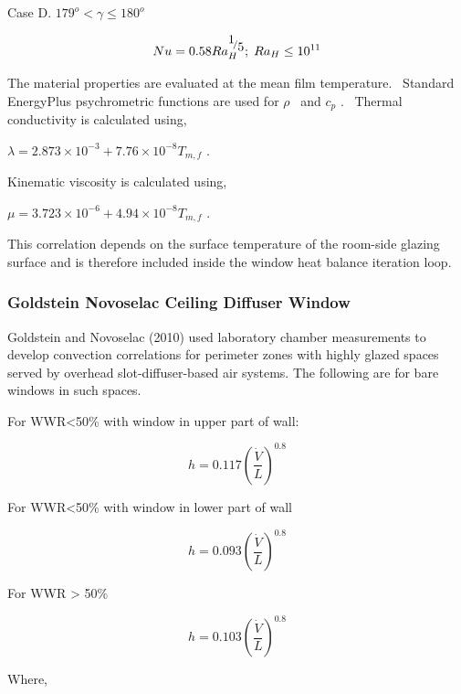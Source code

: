 Case D. \(179^o < \gamma \leq 180^o\)

\begin{equation}
Nu = 0.58Ra_H^{{\raise0.7ex\hbox{1} \!\mathord{\left/ {\vphantom {1 5}}\right.}\!\lower0.7ex\hbox{5}}};\;R{a_H} \le {10^{11}}
\end{equation}

The material properties are evaluated at the mean film temperature.~ Standard EnergyPlus psychrometric functions are used for \(\rho\) ~and \({c_p}\) .~ Thermal conductivity is calculated using,

\(\lambda = 2.873 \times {10^{ - 3}} + 7.76 \times {10^{ - 8}}{T_{m,f}}\) .

Kinematic viscosity is calculated using,

\(\mu = 3.723 \times {10^{ - 6}} + 4.94 \times {10^{ - 8}}{T_{m,f}}\) .

This correlation depends on the surface temperature of the room-side glazing surface and is therefore included inside the window heat balance iteration loop.

\subsubsection{Goldstein Novoselac Ceiling Diffuser Window}\label{goldstein-novoselac-ceiling-diffuser-window}

Goldstein and Novoselac (2010) used laboratory chamber measurements to develop convection correlations for perimeter zones with highly glazed spaces served by overhead slot-diffuser-based air systems. The following are for bare windows in such spaces.

For WWR\textless{}50\% with window in upper part of wall:

\begin{equation}
h = 0.117{\left( {\frac{{\dot V}}{L}} \right)^{0.8}}
\end{equation}

For WWR\textless{}50\% with window in lower part of wall

\begin{equation}
h = 0.093{\left( {\frac{{\dot V}}{L}} \right)^{0.8}}
\end{equation}

For WWR \textgreater{} 50\%

\begin{equation}
h = 0.103{\left( {\frac{{\dot V}}{L}} \right)^{0.8}}
\end{equation}

Where,

